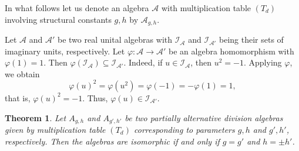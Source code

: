 \documentclass{amsart}
\theoremstyle{definition}
\theoremstyle{plain}
\newtheorem{theorem}{Theorem}
\begin{document}
In what follows let us denote an algebra $\mathcal A$ with multiplication table $(T_d)$ involving structural constants $g, h$ by $\mathcal A_{g,h}$. 
\par\medskip
{} 
Let $\mathcal A$ and $\mathcal A'$ be two real unital algebras with ${\mathcal I}_{\mathcal A}$ and ${\mathcal I}_{\mathcal A'}$ being their sets of imaginary units, respectively. Let $\varphi: \mathcal A \to \mathcal A'$ be an algebra homomorphism with $\varphi(1)=1$.  Then $\varphi( {\mathcal I}_{\mathcal A}) \subseteq  {\mathcal I}_{\mathcal A'}.$ Indeed, 
 if $u\in \mathcal I_{\mathcal A}$, then $u^2=-1$. Applying $\varphi$, we obtain $$ \varphi(u)^2=\varphi(u^2)  = \varphi(-1)=-\varphi(1)=1,$$ that is, $\varphi(u)^2 = -1$. Thus, $\varphi(u) \in \mathcal I_{\mathcal A'}$.

\par\medskip

\begin{theorem} \label{isomcond}
Let $A_{g, h}$ and $A_{g', h'}$ be two partially alternative division algebras given by multiplication table $(T_d)$ corresponding to parameters $g, h$ and $g', h'$, respectively.  Then the algebras are isomorphic if and only if $g=g'$ and $h = \pm h'$.
\end{theorem}
\end{document}
